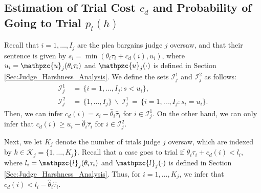 \documentclass[11pt, oneside]{article}   	%
\theoremstyle{ModifiedStyle}
\begin{document}
\subsection{Estimation of Trial Cost $c_d$ and Probability of Going to Trial $p_t(h)$}
Recall that $i=1,\ldots,I_j$ are the plea bargains judge $j$ oversaw, and that their sentence is given by $s_i=\min(\theta_i\tau_i+c_d(i),u_i)$, where $u_i = \mathpzc{u}_j(\theta_i\tau_i)$ and $\mathpzc{u}_j(\cdot)$ is defined in Section \ref{Sec:Judge_Harshness_Analysis}. We define the sets $\mathcal{I}_j^1$ and $\mathcal{I}_j^2$ as follows:
	\begin{align*}
		\mathcal{I}_j^1 &\,=\, \{i=1,\ldots,I_j: s < u_i\}, \\
		\mathcal{I}_j^2 &\,=\, \{1,\ldots,I_j\} \,\backslash\, \mathcal{I}_j^1 \,=\, \{i=1,\ldots,I_j:s_i=u_i\}.
	\end{align*}
	Then, we can infer $c_d(i) = s_i - \hat{\theta}_i\hat{\tau}_i$ for $i\in\mathcal{I}_j^1$. On the other hand, we can only infer that $c_d(i) \geq u_i - \hat{\theta}_i\hat{\tau}_i$ for $i\in\mathcal{I}^2_j$.

Next, we let $K_j$ denote the number of trials judge $j$ oversaw, which are indexed by $k \in \mathcal{K}_j = \{1,\ldots,K_j\}$. Recall that a case goes to trial if $\theta_i\tau_i+c_d(i)<l_i$, where $l_i=\mathpzc{l}_j(\theta_i\tau_i)$ and $\mathpzc{l}_j(\cdot)$ is defined in Section \ref{Sec:Judge_Harshness_Analysis}. Thus, for $i=1,\ldots,K_j$, we infer that $c_d(i) < l_i-\hat{\theta}_i\hat{\tau}_i$.
\end{document}

